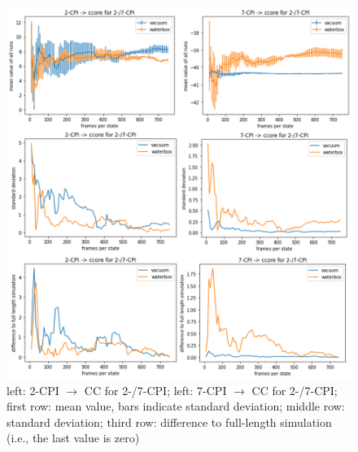 \begin{figure}[!htb]
	
	\includegraphics[scale=0.9]{cpi_short}\caption{left: 2-CPI $\mathrm{\rightarrow}$ CC for 2-/7-CPI; left: 7-CPI $\mathrm{\rightarrow}$ CC for 2-/7-CPI; first row: mean value, bars indicate standard deviation; middle row: standard deviation; third row: difference to full-length simulation (i.e., the last value is zero)}
	\label{fig:cpi_short}
\end{figure}
